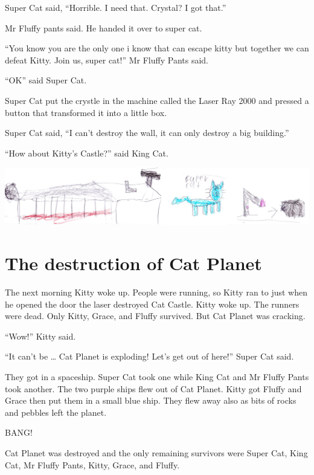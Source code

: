 \documentclass[12pt,oneside]{krantz}
\begin{document}
Super Cat said, ``Horrible. I need that. Crystal? I got that.''

Mr Fluffy pants said. He handed it over to super cat.

``You know you are the only one i know that can escape kitty but
together we can defeat Kitty. Join us, super cat!'' Mr Fluffy Pants
said.

``OK'' said Super Cat.

Super Cat put the crystle in the machine called the Laser Ray 2000 and
pressed a button that transformed it into a little box.

Super Cat said, ``I can't destroy the wall, it can only destroy a big
building.''

``How about Kitty's Castle?'' said King Cat.

\includegraphics{img/supercat.jpg}

\hypertarget{the-destruction-of-cat-planet}{%
\chapter{The destruction of Cat
Planet}\label{the-destruction-of-cat-planet}}

The next morning Kitty woke up. People were running, so Kitty ran to
just when he opened the door the laser destroyed Cat Castle. Kitty woke
up. The runners were dead. Only Kitty, Grace, and Fluffy survived. But
Cat Planet was cracking.

``Wow!'' Kitty said.

``It can't be \ldots{} Cat Planet is exploding! Let's get out of here!''
Super Cat said.

They got in a spaceship. Super Cat took one while King Cat and Mr Fluffy
Pants took another. The two purple ships flew out of Cat Planet. Kitty
got Fluffy and Grace then put them in a small blue ship. They flew away
also as bits of rocks and pebbles left the planet.

BANG!

Cat Planet was destroyed and the only remaining survivors were Super
Cat, King Cat, Mr Fluffy Pants, Kitty, Grace, and Fluffy.
\end{document}
